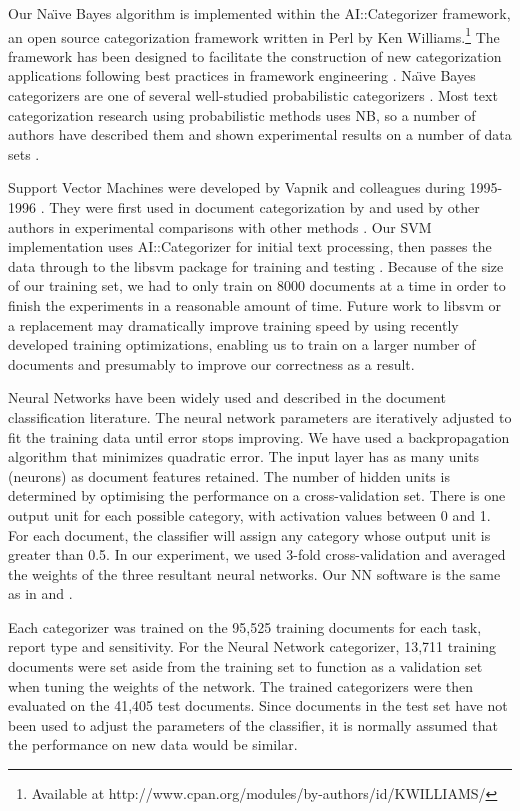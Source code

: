 \documentclass[twocolumn]{article}
\begin{document}
Our Na\"\i ve Bayes algorithm is implemented within the
AI::Cat\-e\-go\-riz\-er framework, an open source categorization
framework written in Perl by Ken Williams.\footnote{Available at 
http://www.cpan.org/modules/by-authors/id/KWILLIAMS/} The framework
has been designed to facilitate the construction of new categorization
applications following best practices in framework engineering
\cite{fayad:99}. Na\"\i ve Bayes categorizers are one of several
well-studied probabilistic categorizers \cite{lewis:98}. Most text
categorization research using probabilistic methods uses NB, so a
number of authors have described them and shown experimental results
on a number of data sets \cite{yang:99}.

Support Vector Machines were developed by Vapnik and colleagues during
1995-1996 \cite{cortes:95} \cite{scholkopf:99}. They were first used
in document categorization by \cite{joachims:98} \cite{joachims:99}
and used by other authors in experimental comparisons with other
methods \cite{yang:99}.  Our SVM implementation uses AI::Categorizer
for initial text processing, then passes the data through to the
libsvm package for training and testing \cite{libsvm}.  Because of the
size of our training set, we had to only train on 8000 documents at a
time in order to finish the experiments in a reasonable amount of
time.  Future work to libsvm or a replacement may dramatically improve
training speed by using recently developed training optimizations,
enabling us to train on a larger number of documents and presumably to
improve our correctness as a result.

Neural Networks have been widely used and described in the document
classification literature. \cite{yang:99} \cite{calvo:00}
\cite{calvo:01} The neural network parameters are iteratively adjusted
to fit the training data until error stops improving. We have used a
backpropagation algorithm that minimizes quadratic error. The input
layer has as many units (neurons) as document features retained. The
number of hidden units is determined by optimising the performance on
a cross-validation set. There is one output unit for each possible
category, with activation values between 0 and 1. For each document,
the classifier will assign any category whose output unit is greater
than 0.5. In our experiment, we used 3-fold cross-validation and
averaged the weights of the three resultant neural networks.  Our NN
software is the same as in \cite{calvo:00} and \cite{calvo:01}.

Each categorizer was trained on the 95,525 training documents for each
task, report type and sensitivity.  For the Neural Network
categorizer, 13,711 training documents were set aside from the
training set to function as a validation set when tuning the weights
of the network.  The trained categorizers were then evaluated on the
41,405 test documents. Since documents in the test set have not been
used to adjust the parameters of the classifier, it is normally
assumed that the performance on new data would be similar.
\end{document}
